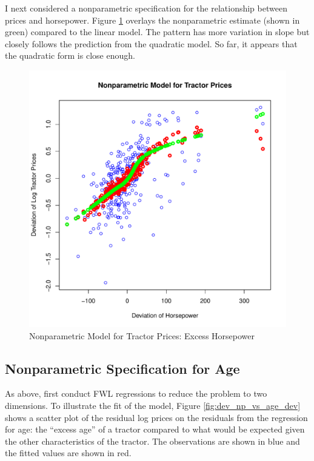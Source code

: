 I next considered a nonparametric specification for 
the relationship between prices and horsepower.
Figure \ref{fig:dev_np_vs_horse_dev} 
overlays the nonparametric estimate (shown in green) 
compared to the linear model.
The pattern has more variation in slope but 
closely follows the prediction from the quadratic model. 
So far, it appears that the quadratic form
is close enough.

\begin{figure}[h!]
  \centering
  \includegraphics[scale = 0.5, keepaspectratio=true]{../Figures/dev_np_vs_horse_dev}
  \caption{Nonparametric Model for Tractor Prices: Excess Horsepower} \label{fig:dev_np_vs_horse_dev}
\end{figure}

 


\clearpage
\subsection{Nonparametric Specification for Age}

As above, first conduct FWL regressions 
to reduce the problem to two dimensions. 
% 
To illustrate the fit of the model, 
Figure \ref{fig:dev_np_vs_age_dev} 
shows a scatter plot 
of the residual log prices on 
the residuals from the regression for age:
the ``excess age'' of a tractor compared to what would be 
expected given the other characteristics of the tractor. 
% 
The observations are shown in blue
and the fitted values are shown in red.

